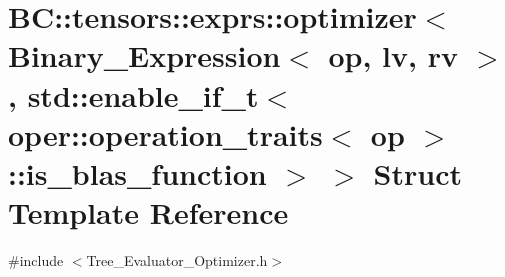 \hypertarget{structBC_1_1tensors_1_1exprs_1_1optimizer_3_01Binary__Expression_3_01op_00_01lv_00_01rv_01_4_00_183e68db6823926ca0c2e82552c93f0f}{}\section{BC\+:\+:tensors\+:\+:exprs\+:\+:optimizer$<$ Binary\+\_\+\+Expression$<$ op, lv, rv $>$, std\+:\+:enable\+\_\+if\+\_\+t$<$ oper\+:\+:operation\+\_\+traits$<$ op $>$\+:\+:is\+\_\+blas\+\_\+function $>$ $>$ Struct Template Reference}
\label{structBC_1_1tensors_1_1exprs_1_1optimizer_3_01Binary__Expression_3_01op_00_01lv_00_01rv_01_4_00_183e68db6823926ca0c2e82552c93f0f}


{\ttfamily \#include $<$Tree\+\_\+\+Evaluator\+\_\+\+Optimizer.\+h$>$}

